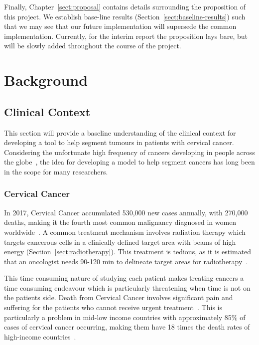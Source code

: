 \documentclass[11pt,twoside]{report}
\begin{document}
Finally, Chapter~\ref{sect:proposal} contains details surrounding the proposition of this project. We establish base-line results (Section~\ref{sect:baseline-results}) such that we may see that our future implementation will supersede the common implementation. Currently, for the interim report the proposition lays bare, but will be slowly added throughout the course of the project. 

\chapter{Background}\label{sect:background}

\section{Clinical Context}\label{sect:clinical-context}

This section will provide a baseline understanding of the clinical context for developing a tool to help segment tumours in patients with cervical cancer. Considering the unfortunate high frequency of cancers developing in people across the globe~\cite{cervical-cancer-epidemic}, the idea for developing a model to help segment cancers has long been in the scope for many researchers.

\subsection{Cervical Cancer}\label{sect:cervical-cancer}

In 2017, Cervical Cancer accumulated 530,000 new cases annually, with 270,000 deaths, making it the fourth most common malignancy diagnosed in women worldwide~\cite{cervical-cancer-epidemic}. A common treatment mechanism involves radiation therapy which targets cancerous cells in a clinically defined target area with beams of high energy (Section~\ref{sect:radiotherapy}). This treatment is tedious, as it is estimated that an oncologist needs 90-120 min to delineate target areas for radiotherapy~\cite{LIU2020184}.

This time consuming nature of studying each patient makes treating cancers a time consuming endeavour which is particularly threatening when time is not on the patients side. Death from Cervical Cancer involves significant pain and suffering for the patients who cannot receive urgent treatment~\cite{cervical-cancer-epidemic}. This is particularly a problem in mid-low income countries with approximately 85\% of cases of cervical cancer occurring, making them have 18 times the death rates of high-income countries~\cite{cervical-cancer-epidemic}. 
\end{document}
